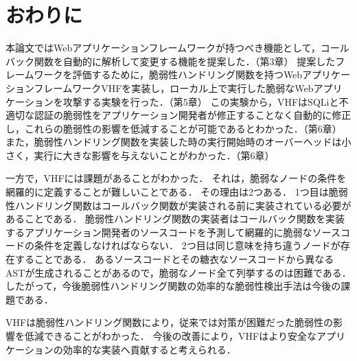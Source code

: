 \documentclass[a4paper,12pt]{jreport}
\begin{document}
\chapter{おわりに}
本論文ではWebアプリケーションフレームワークが持つべき機能として，コールバック関数を自動的に解析して変更する機能を提案した．（第3章）
提案したフレームワークを評価するために，脆弱性ハンドリング関数を持つWebアプリケーションフレームワークVHFを実装し，ローカル上で実行した脆弱なWebアプリケーションを攻撃する実験を行った．（第5章）
この実験から，VHFはSQLiと不適切な認証の脆弱性をアプリケーション開発者が修正することなく自動的に修正し，これらの脆弱性の影響を低減することが可能であるとわかった．（第6章）
また，脆弱性ハンドリング関数を実装した時の実行開始時のオーバーヘッドは小さく，実行に大きな影響を与えないことがわかった．（第6章）

一方で，VHFには課題があることがわかった．
それは，脆弱なノードの条件を網羅的に定義することが難しいことである．
その理由は2つある．
1つ目は脆弱性ハンドリング関数はコールバック関数が実装される前に実装されている必要があることである．
脆弱性ハンドリング関数の実装者はコールバック関数を実装するアプリケーション開発者のソースコードを予測して網羅的に脆弱なソースコードの条件を定義しなければならない．
2つ目は同じ意味を持ち違うノードが存在することである．
あるソースコードとその糖衣なソースコードから異なるASTが生成されることがあるので，脆弱なノード全て列挙するのは困難である．
したがって，今後脆弱性ハンドリング関数の効率的な脆弱性検出手法は今後の課題である．

VHFは脆弱性ハンドリング関数により，従来では対策が困難だった脆弱性の影響を低減できることがわかった．
今後の改善により，VHFはより安全なアプリケーションの効率的な実装へ貢献すると考えられる．



\end{document}
